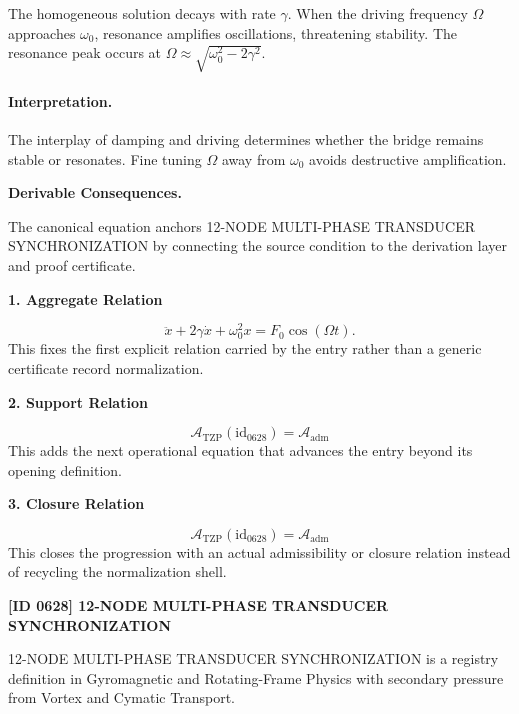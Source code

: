 The homogeneous solution decays with rate $\gamma$.  When the driving frequency $\Omega$ approaches $\omega_0$, resonance amplifies oscillations, threatening stability.
The resonance peak occurs at $\Omega \approx \sqrt{\omega_0^2 - 2\gamma^2}$.

\paragraph{Interpretation.}

The interplay of damping and driving determines whether the bridge remains stable or resonates.  Fine tuning $\Omega$ away from $\omega_0$ avoids destructive amplification.

\par\vspace{0.35em}
\noindent\textbf{Derivable Consequences.}\quad
\begingroup
\footnotesize
\raggedright
The canonical equation anchors 12-NODE MULTI-PHASE TRANSDUCER SYNCHRONIZATION by connecting the source condition to the derivation layer and proof certificate.
\par\endgroup

\noindent\textbf{1. Aggregate Relation}\par
\[
\ddot{x} + 2\gamma\dot{x} + \omega_0^2 x = F_0\cos(\Omega t).
\]
\noindent This fixes the first explicit relation carried by the entry rather than a generic certificate record normalization.\par
\noindent\textbf{2. Support Relation}\par
\[
\mathcal{A}_{\mathrm{TZP}}(\mathrm{id}_{0628})=\mathcal{A}_{\mathrm{adm}}
\]
\noindent This adds the next operational equation that advances the entry beyond its opening definition.\par
\noindent\textbf{3. Closure Relation}\par
\[
\mathcal{A}_{\mathrm{TZP}}(\mathrm{id}_{0628})=\mathcal{A}_{\mathrm{adm}}
\]
\noindent This closes the progression with an actual admissibility or closure relation instead of recycling the normalization shell.\par

\clearpage
\noindent\textbf{[ID 0628] 12-NODE MULTI-PHASE TRANSDUCER SYNCHRONIZATION}\par
\vspace{0.35em}
\begingroup\small
{}
12-NODE MULTI-PHASE TRANSDUCER SYNCHRONIZATION is a registry definition in Gyromagnetic and Rotating-Frame Physics with secondary pressure from Vortex and Cymatic Transport.


